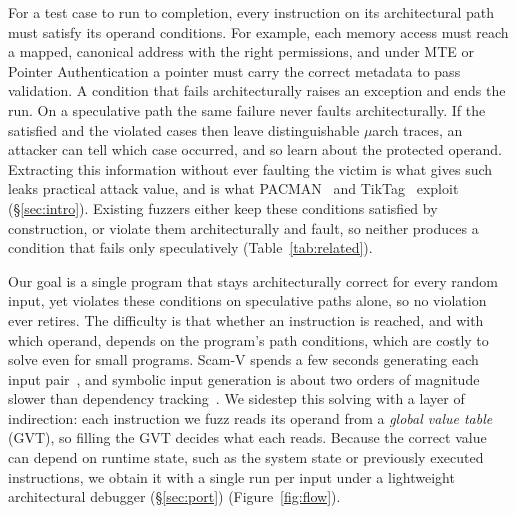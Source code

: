 \documentclass[letterpaper,twocolumn,10pt]{article}
\makeatletter
\theoremstyle{definition}
\def\uarch@bold#1#2\@nil{\if b#1\boldmath\fi}
\DeclareRobustCommand{\uarch}{{\expandafter\uarch@bold\f@series\@nil\ensuremath{\mu}}arch\xspace}
\makeatother
\begin{document}
For a test case to run to completion, every instruction on its architectural path must satisfy
its operand conditions. For example, each memory access must reach a mapped, canonical address
with the right permissions, and under MTE or Pointer Authentication a pointer must carry the
correct metadata to pass validation. A condition that fails architecturally raises an exception
and ends the run. On a speculative path the same failure never faults architecturally. If the satisfied and the
violated cases then leave distinguishable \uarch traces, an attacker can tell which case occurred, and so learn about the protected operand. Extracting this information without ever faulting the victim is what
gives such leaks practical attack value, and is what PACMAN~\cite{pacman} and TikTag~\cite{tiktag}
exploit (\S\ref{sec:intro}). Existing fuzzers either keep these conditions satisfied
by construction, or violate them architecturally and fault, so neither produces a condition that
fails only speculatively (Table~\ref{tab:related}).

Our goal is a single program that stays architecturally correct for every random input, yet
violates these conditions on speculative paths alone, so no violation ever retires. The difficulty
is that whether an instruction is reached, and with which operand, depends on the program's path
conditions, which are costly to solve even for small programs. Scam-V spends a few seconds
generating each input pair~\cite{scamv_micro}, and symbolic input generation is about two orders of magnitude
slower than dependency tracking~\cite{hide_seek}. We sidestep this solving with a layer of indirection: each instruction we fuzz reads its operand
from a \emph{global value table} (GVT), so filling the GVT decides what each reads. Because the
correct value can depend on runtime state, such as the system state or previously executed
instructions, we obtain it with a single run per input under a lightweight architectural debugger
(\S\ref{sec:port}) (Figure~\ref{fig:flow}).
\end{document}
